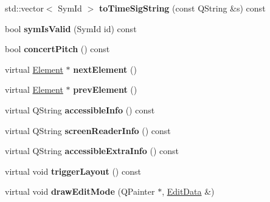 \begin{DoxyCompactItemize}
std\+::vector$<$ Sym\+Id $>$ {\bfseries to\+Time\+Sig\+String} (const Q\+String \&s) const
\item 
\mbox{\label{class_ms_1_1_element_a95c4ffee60af75b49f6e1c644db44493}} 
bool {\bfseries sym\+Is\+Valid} (Sym\+Id id) const
\item 
\mbox{\label{class_ms_1_1_element_a688112ba0053649f6ec94ed4efa19584}} 
bool {\bfseries concert\+Pitch} () const
\item 
\mbox{\label{class_ms_1_1_element_a81092ae7891eb2ac2d43d6fe86e1e749}} 
virtual \hyperlink{class_ms_1_1_element}{Element} $\ast$ {\bfseries next\+Element} ()
\item 
\mbox{\label{class_ms_1_1_element_ad48ce06a988e98b0da7d4cf1e6f56ded}} 
virtual \hyperlink{class_ms_1_1_element}{Element} $\ast$ {\bfseries prev\+Element} ()
\item 
\mbox{\label{class_ms_1_1_element_a249d3763ecc760841d71c305004d4c93}} 
virtual Q\+String {\bfseries accessible\+Info} () const
\item 
\mbox{\label{class_ms_1_1_element_a965327598f61fdc8b3b8f4160dfa13c8}} 
virtual Q\+String {\bfseries screen\+Reader\+Info} () const
\item 
\mbox{\label{class_ms_1_1_element_ad28416b7cf27aad952ff9e872284ee54}} 
virtual Q\+String {\bfseries accessible\+Extra\+Info} () const
\item 
\mbox{\label{class_ms_1_1_element_ab28ffe83fb1064fb3c2a6fa648bca688}} 
virtual void {\bfseries trigger\+Layout} () const
\item 
\mbox{\label{class_ms_1_1_element_aeacd589786e73e54e81ba2cc9a812126}} 
virtual void {\bfseries draw\+Edit\+Mode} (Q\+Painter $\ast$, \hyperlink{class_ms_1_1_edit_data}{Edit\+Data} \&)
\end{DoxyCompactItemize}
